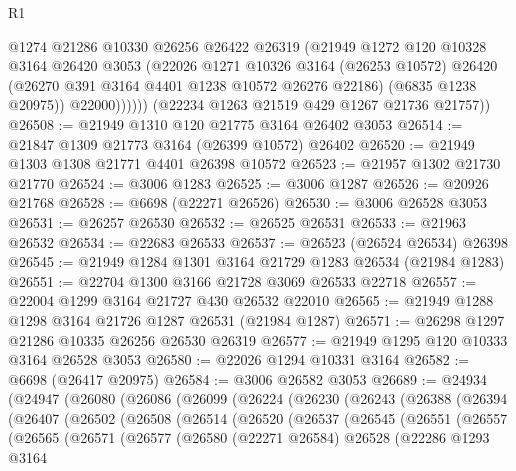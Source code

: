 \begin{lexlean}{R1}
\begin{coremodule}
                @1274
                @21286
                @10330
                @26256
                @26422
                @26319
                (@21949
                  @1272
                  @120
                  @10328
                  @3164
                  @26420
                  @3053
                  (@22026
                    @1271
                    @10326
                    @3164
                    (@26253 @10572)
                    @26420
                    (@26270 @391 @3164 @4401 @1238 @10572 @26276 @22186)
                    (@6835 @1238 @20975))
                  @22000))))))
      (@22234 @1263 @21519 @429 @1267 @21736 @21757))
@26508 := @21949 @1310 @120 @21775 @3164 @26402 @3053
@26514 := @21847 @1309 @21773 @3164 (@26399 @10572) @26402
@26520 := @21949 @1303 @1308 @21771 @4401 @26398 @10572
@26523 := @21957 @1302 @21730 @21770
@26524 := @3006 @1283
@26525 := @3006 @1287
@26526 := @20926 @21768
@26528 := @6698 (@22271 @26526)
@26530 := @3006 @26528 @3053
@26531 := @26257 @26530
@26532 := @26525 @26531
@26533 := @21963 @26532
@26534 := @22683 @26533
@26537 := @26523 (@26524 @26534) @26398
@26545 := @21949 @1284 @1301 @3164 @21729 @1283 @26534 (@21984 @1283)
@26551 := @22704 @1300 @3166 @21728 @3069 @26533 @22718
@26557 := @22004 @1299 @3164 @21727 @430 @26532 @22010
@26565 := @21949 @1288 @1298 @3164 @21726 @1287 @26531 (@21984 @1287)
@26571 := @26298 @1297 @21286 @10335 @26256 @26530 @26319
@26577 := @21949 @1295 @120 @10333 @3164 @26528 @3053
@26580 := @22026 @1294 @10331 @3164
@26582 := @6698 (@26417 @20975)
@26584 := @3006 @26582 @3053
@26689 := @24934
    (@24947
      (@26080
        (@26086
          (@26099
            (@26224
              (@26230
                (@26243
                  (@26388
                    (@26394
                      (@26407
                        (@26502
                          (@26508
                            (@26514
                              (@26520
                                (@26537
                                  (@26545
                                    (@26551
                                      (@26557
                                        (@26565
                                          (@26571
                                            (@26577
                                              (@26580
                                                (@22271 @26584)
                                                @26528
                                                (@22286
                                                  @1293
                                                  @3164

\end{coremodule}
\end{lexlean}
